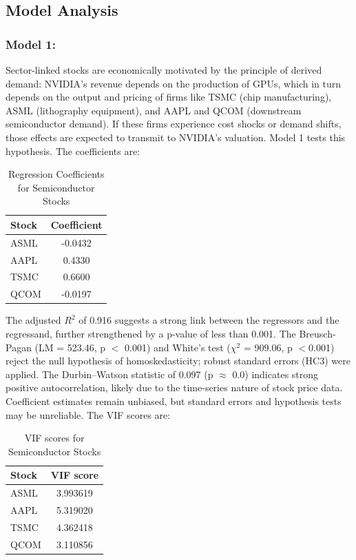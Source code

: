 \documentclass[12pt]{article}
\begin{document}
    \vspace{2em}
    
    \subsection{Model Analysis}
    
    \subsubsection{Model 1:} \label{sec:model1}
    
    Sector-linked stocks are economically motivated by the principle of derived demand: NVIDIA's revenue depends on the production of GPUs, which in turn depends on the output and pricing of firms like TSMC (chip manufacturing), ASML (lithography equipment), and AAPL and QCOM (downstream semiconductor demand). If these firms experience cost shocks or demand shifts, those effects are expected to transmit to NVIDIA's valuation. Model 1 tests this hypothesis. The coefficients are:
    
    \begin{table}[h]
    \centering
    \begin{tabular}{lc}
    \hline
    \textbf{Stock} & \textbf{Coefficient} \\
    \hline
    ASML & -0.0432 \\
    AAPL & 0.4330 \\
    TSMC & 0.6600 \\
    QCOM & -0.0197 \\
    \hline
    \end{tabular}
    \caption{Regression Coefficients for Semiconductor Stocks}
    \end{table}
    
    The adjusted $R^2$ of 0.916 suggests a strong link between the regressors and the regressand, further strengthened by a p-value of less than 0.001. The Breusch-Pagan (LM = 523.46, p $<$ 0.001) and White's test ($\chi^2$ = 909.06, p $<$0.001) reject the null hypothesis of homoskedasticity; robust standard errors (HC3) were applied. The Durbin--Watson statistic of 0.097 (p $\approx$ 0.0) indicates strong positive autocorrelation, likely due to the time-series nature of stock price data. Coefficient estimates remain unbiased, but standard errors and hypothesis tests may be unreliable. The VIF scores are:
    
    \begin{table}[h]
    \centering
    \begin{tabular}{lc}
    \hline
    \textbf{Stock} & \textbf{VIF score} \\
    \hline
    ASML & 3.993619 \\
    AAPL & 5.319020 \\
    TSMC & 4.362418 \\
    QCOM & 3.110856 \\
    \hline
    \end{tabular}
    \caption{VIF scores for Semiconductor Stocks}
    \end{table}
    
\end{document}
